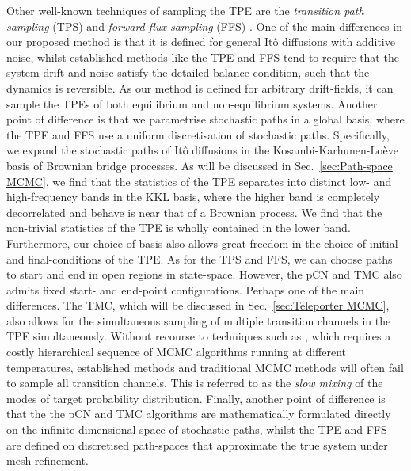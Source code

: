 Other well-known techniques of sampling the TPE are the \textit{transition path sampling} (TPS) \citep{dellagoTransitionPathSampling1998, dellagoCalculationReactionRate1999, dellagoEfficientTransitionPath1998a, bolhuisTransitionPathSampling, bolhuisTransitionPathSampling2002} and \textit{forward flux sampling} (FFS) \citep{escobedoTransitionPathSampling2009, allenForwardFluxSamplingtype2006a, hussainStudyingRareEvents2020}. One of the main
 differences in our proposed method is that it is defined for general It\^{o} diffusions with additive noise, whilst established methods like the TPE and FFS tend to require that the system drift and noise satisfy the detailed balance condition, such that the dynamics is reversible. As our method is defined for arbitrary drift-fields, it can sample the TPEs of both equilibrium and non-equilibrium systems. Another point of difference is that we parametrise stochastic paths in a global basis, where the TPE and FFS use a uniform discretisation of stochastic paths. Specifically, we expand the stochastic paths of It\^{o} diffusions in the Kosambi-Karhunen-Lo\`eve basis of Brownian bridge processes. As will be discussed in Sec.~\ref{sec:Path-space MCMC}, we find that the statistics of the TPE separates into distinct low- and high-frequency bands in the KKL basis, where the higher band is completely decorrelated and behave is near that of a Brownian process. We find that the non-trivial statistics of the TPE is wholly contained in the lower band. Furthermore, our choice of basis also allows great freedom in the choice of initial- and final-conditions of the TPE. As for the TPS and FFS, we can choose paths to start and end in open regions in state-space. However, the pCN and TMC also admits fixed start- and end-point configurations. Perhaps one of the main differences. The TMC, which will be discussed in Sec.~\ref{sec:Teleporter MCMC}, also allows for the simultaneous sampling of multiple transition channels in the TPE simultaneously. Without recourse to techniques such as \citep{earlParallelTemperingTheory2005, fujisakiOnsagerMachlupActionbased2010}, which requires a costly hierarchical sequence of MCMC algorithms running at different temperatures, established methods and traditional MCMC methods will often fail to sample all transition channels. This is referred to as the \textit{slow mixing} \citep{holdenMixingMCMCAlgorithms2019} of the modes of target probability distribution. Finally, another point of difference is that the the pCN and TMC algorithms are mathematically formulated directly on the infinite-dimensional space of stochastic paths, whilst the TPE and FFS are defined on discretised path-spaces that approximate the true system under mesh-refinement.

